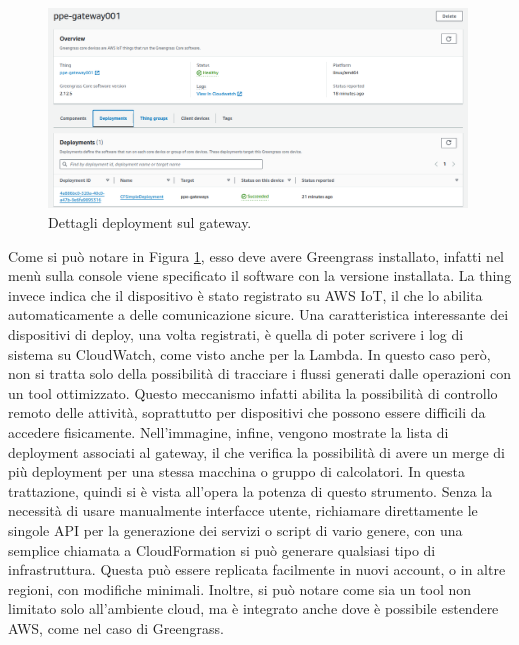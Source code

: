 \begin{figure}[htbp]
    \centering
    \includegraphics[width=0.99\textwidth]{figures/gateway-specs.png}
    \caption{Dettagli deployment sul gateway.} 
    \label{fig:gateway-specs}
\end{figure}

Come si può notare in Figura \ref{fig:gateway-specs}, esso deve avere Greengrass installato, infatti nel menù sulla console viene specificato il software con la versione installata. La thing invece indica che il dispositivo è stato registrato su AWS IoT, il che lo abilita automaticamente a delle comunicazione sicure. Una caratteristica interessante dei dispositivi di deploy, una volta registrati, è quella di poter scrivere i log di sistema su CloudWatch, come visto anche per la Lambda. In questo caso però, non si tratta solo della possibilità di tracciare i flussi generati dalle operazioni con un tool ottimizzato. Questo meccanismo infatti abilita la possibilità di controllo remoto delle attività, soprattutto per dispositivi che possono essere difficili da accedere fisicamente. Nell'immagine, infine, vengono mostrate la lista di deployment associati al gateway, il che verifica la possibilità di avere un merge di più deployment per una stessa macchina o gruppo di calcolatori. In questa trattazione, quindi si è vista all'opera la potenza di questo strumento. Senza la necessità di usare manualmente interfacce utente, richiamare direttamente le singole API per la generazione dei servizi o script di vario genere, con una semplice chiamata a CloudFormation si può generare qualsiasi tipo di infrastruttura. Questa può essere replicata facilmente in nuovi account, o in altre regioni, con modifiche minimali. Inoltre, si può notare come sia un tool non limitato solo all'ambiente cloud, ma è integrato anche dove è possibile estendere AWS, come nel caso di Greengrass.  

  
